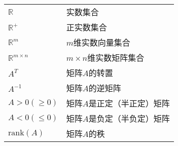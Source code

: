 

\begin{fuhao}
\begin{tabular}{p{5cm} p{10cm}}
$\mathbb{R}$                                                           &             实数集合\\
$\mathbb{R}^+$                                                        &            正实数集合\\
$\mathbb{R}^m$                                                      &            $m$维实数向量集合\\
$\mathbb{R}^{m\times n}$                                       &   $m\times n$维实数矩阵集合\\
$A^T$                                                                     &     矩阵$A$的转置\\
$A^{-1}$                                                                 &       矩阵$A$的逆矩阵\\
$A>0(\geq 0)$                                                          &       矩阵$A$是正定（半正定）矩阵\\
$A<0(\leq 0)$                                                           &       矩阵$A$是负定（半负定）矩阵\\
$\text{rank}(A)$                                                      &       矩阵$A$的秩
\end{tabular}
\end{fuhao}
